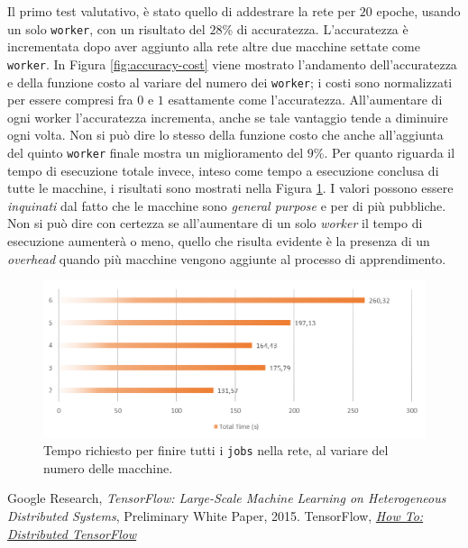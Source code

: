 \documentclass[DIV=calc, paper=a4, fontsize=11pt]{scrartcl}	 %
\begin{document}
\begin{multicols}{2}
			Il primo test valutativo, è stato quello di addestrare la rete per $20$ epoche, usando un solo \texttt{worker}, con un risultato del $28$\% di accuratezza. L'accuratezza è incrementata dopo aver aggiunto alla rete altre due macchine settate come \texttt{worker}. In Figura \ref{fig:accuracy-cost} viene mostrato l'andamento dell'accuratezza e della funzione costo al variare del numero dei \texttt{worker}; i costi sono normalizzati per essere compresi fra $0$ e $1$ esattamente come l'accuratezza. All'aumentare di ogni worker l'accuratezza incrementa, anche se tale vantaggio tende a diminuire ogni volta. Non si può dire lo stesso della funzione costo che anche all'aggiunta del quinto \texttt{worker} finale mostra un miglioramento del $9$\%. Per quanto riguarda il tempo di esecuzione totale invece, inteso come tempo a esecuzione conclusa di tutte le macchine, i risultati sono mostrati nella Figura \ref{fig:total-time}. I valori possono essere \textit{inquinati} dal fatto che le macchine sono \textit{general purpose} e per di più pubbliche. Non si può dire con certezza se all'aumentare di un solo \textit{worker} il tempo di esecuzione aumenterà o meno, quello che risulta evidente è la presenza di un \textit{overhead} quando più macchine vengono aggiunte al processo di apprendimento.
			\begin{figure}[th!]
				\centering
				\includegraphics[scale=.95]{img/total-time.png}
				\caption{Tempo richiesto per finire tutti i \texttt{jobs} nella rete, al variare del numero delle macchine.}
				\label{fig:total-time}
			\end{figure}
			
		\begin{thebibliography}{9}
			Google Research,
			\emph{TensorFlow: Large-Scale Machine Learning on Heterogeneous Distributed Systems},
			Preliminary White Paper,
			2015.
			TensorFlow,
			\emph{\href{https://www.tensorflow.org/versions/r0.10/how_tos/distributed/}{How To: Distributed TensorFlow}}
		\end{thebibliography}
	\end{multicols}
\end{document}
